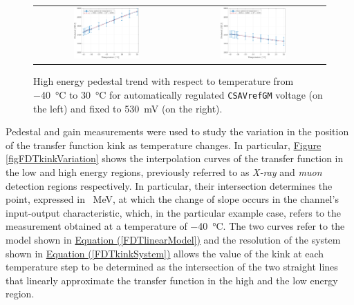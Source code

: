 \begin{figure}[h!]
    \centering
    \begin{tabular}{cc}
        \includegraphics[width=0.475\textwidth]{Images/chap1/results/gain_pedestal/high_energy_pedestal_auto_0011.pdf} & \includegraphics[width=0.475\textwidth]{Images/chap1/results/gain_pedestal/high_energy_pedestal_530mV.pdf}\\
    \end{tabular}
    \caption{High energy pedestal trend with respect to temperature from \SI{-40}{\celsius} to \SI{30}{\celsius} for automatically regulated \texttt{CSAVrefGM} voltage (on the left) and fixed to \SI{530}{\milli\volt} (on the right).}
    \label{figFDTpedestalHighEnergies}
\end{figure}

\par
Pedestal and gain measurements were used to study the variation in the position of the transfer function kink as temperature changes. In particular, \hyperref[figFDTkinkVariation]{Figure \ref{figFDTkinkVariation}} shows the interpolation curves of the transfer function in the low and high energy regions, previously referred to as \textit{X-ray} and \textit{muon} detection regions respectively. In particular, their intersection determines the point, expressed in \SI{}{\mega\electronvolt}, at which the change of slope occurs in the channel's input-output characteristic, which, in the particular example case, refers to the measurement obtained at a temperature of \SI{-40}{\celsius}. The two curves refer to the model shown in \hyperref[FDTlinearModel]{Equation (\ref{FDTlinearModel})} and the resolution of the system shown in \hyperref[FDTkinkSystem]{Equation (\ref{FDTkinkSystem})} allows the value of the kink at each temperature step to be determined as the intersection of the two straight lines that linearly approximate the transfer function in the high and the low energy region.

